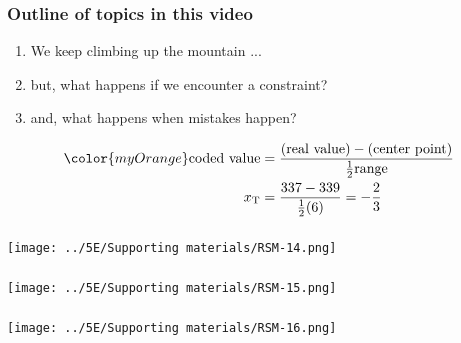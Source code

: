
\begin{frame}\frametitle{Outline of topics in this video}
	\begin{enumerate}
		\item	We keep climbing up the mountain ... \pause
		\item	but, what happens if we encounter a constraint? \pause
		\item	and, what happens when mistakes happen?\pause
	\end{enumerate}
	
	\begin{align*}
		\color{myOrange}\text{coded value} &= \dfrac{(\text{real value}) - (\text{center point})}{\tfrac{1}{2}\text{range}} \\
		x_\text{T} &= \dfrac{337 - 339}{\tfrac{1}{2}(6)} = -\dfrac{2}{3}
	\end{align*}
\end{frame}

\begin{frame}\frametitle{}
	\centerline{\texttt{[image: ../5E/Supporting materials/RSM-14.png]}}
\end{frame}

\begin{frame}\frametitle{}
	\centerline{\texttt{[image: ../5E/Supporting materials/RSM-15.png]}}
\end{frame}

\begin{frame}\frametitle{}
	\centerline{\texttt{[image: ../5E/Supporting materials/RSM-16.png]}}
\end{frame}

